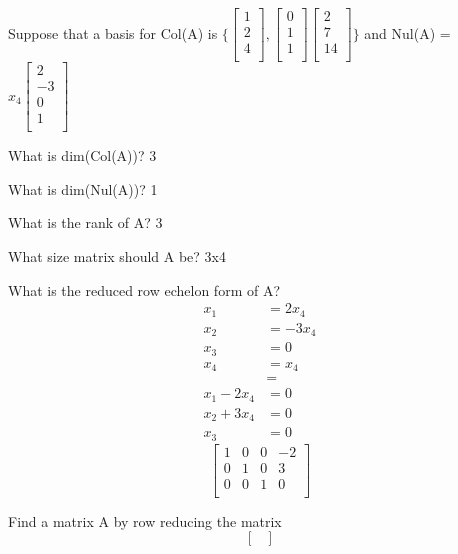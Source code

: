 \begin{prob}
Suppose that a basis for Col(A) is $\{ \begin{bmatrix}
1\\
2\\
4\\
\end{bmatrix},\begin{bmatrix}
0\\
1\\
1\\
\end{bmatrix}\begin{bmatrix}
2\\
7\\
14\\
\end{bmatrix} \} $ and Nul(A) = $x_4 \begin{bmatrix}
2\\
-3\\
0\\
1\\
\end{bmatrix}$
\begin{subprob} What is dim(Col(A))? 3
\end{subprob}
\begin{subprob} What is dim(Nul(A))? 1
\end{subprob}
\begin{subprob} What is the rank of A? 3
\end{subprob}
\begin{subprob} What size matrix should A be? 3x4
\end{subprob}
\begin{subprob} What is the reduced row echelon form of A?
\begin{align*}
x_1&= 2x_4\\
x_2&=-3x_4\\
x_3&=0\\
x_4&=x_4\\
&=\\
x_1-2x_4&=0\\
x_2+3x_4&=0\\
x_3&=0
\end{align*}
$$\begin{bmatrix}
1 & 0 & 0 & -2\\
0 & 1 & 0 & 3\\
0 & 0 & 1 & 0\\
\end{bmatrix}$$
\end{subprob}
\begin{subprob} Find a matrix A by row reducing the matrix $$\begin{bmatrix}

\end{bmatrix}$$
\end{subprob}
\end{prob}
